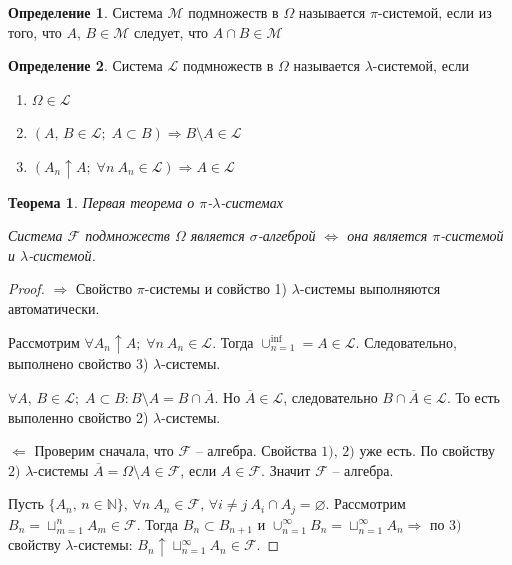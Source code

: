 \documentclass[a4paper,12pt]{article}
\renewcommand{\emptyset}{\ensuremath{\varnothing}}
\theoremstyle{plain}
\newtheorem{theorem}{Теорема}[section]
\theoremstyle{definition}
\newtheorem{definition}{Определение}[section]
\theoremstyle{remark}
\begin{document}
\begin{definition}
	Система $\mathcal{M}$ подмножеств в $\Omega$ называется $\pi$-системой, если из того, что $A,\, B \in \mathcal{M}$ следует, что $A \cap B \in \mathcal{M}$
\end{definition}

\begin{definition}
	Система $\mathcal{L}$ подмножеств в $\Omega$ называется $\lambda$-системой, если
	\begin{enumerate}
		\item $\Omega \in \mathcal{L}$
		\item $(A,\, B \in \mathcal{L};\; A \subset B) \Rightarrow B \setminus A \in \mathcal{L}$
		\item $(A_n \uparrow A;\; \forall n \: A_n \in \mathcal{L}) \Rightarrow A \in \mathcal{L}$
	\end{enumerate}
\end{definition}

\begin{theorem} \label{FIRST_SYSTEM_TH}
	Первая теорема о $\pi$-$\lambda$-системах

	Система $\mathcal{F}$ подмножеств $\Omega$ является $\sigma$-алгеброй $\Leftrightarrow$ она является $\pi$-системой и $\lambda$-системой.
\end{theorem}

\begin{proof}
	$\Rightarrow$ Свойство $\pi$-системы и совйство 1) $\lambda$-системы выполняются автоматически.

	Рассмотрим $\forall A_n \uparrow A;\; \forall n \: A_n \in \mathcal{L}$. Тогда $\cup_{n = 1}^{\inf} = A \in \mathcal{L}$. Следовательно, выполнено свойство 3) $\lambda$-системы.

	$\forall A,\, B \in \mathcal{L};\; A \subset B : B \setminus A = B \cap \overline{A}$. Но $\overline{A} \in \mathcal{L}$, следовательно $B \cap \overline{A} \in \mathcal{L}$.
	То есть выполенно свойство 2) $\lambda$-системы.

	$\Leftarrow$ Проверим сначала, что $\mathcal{F}$ -- алгебра. Свойства $1),\,2)$ уже есть. По свойству $2)$ $\lambda$-системы $\overline{A} = \Omega \setminus A \in \mathcal{F}$, если $A \in \mathcal{F}$. Значит $\mathcal{F}$ -- алгебра.

	Пусть $\{A_n,\, n \in \mathbb{N}\},\, \forall n \: A_n \in \mathcal{F},\, \forall i \neq j \: A_i \cap A_j = \emptyset$. Рассмотрим $B_n = \sqcup_{m = 1}^n A_m \in \mathcal{F}$. Тогда $B_n \subset B_{n + 1}$ и $\cup_{n = 1}^\infty B_n = \sqcup_{n = 1}^\infty A_n \Rightarrow$ по $3)$ свойству $\lambda$-системы: $B_n \uparrow \sqcup_{n = 1}^\infty A_n \in \mathcal{F}$.
\end{proof}
\end{document}
